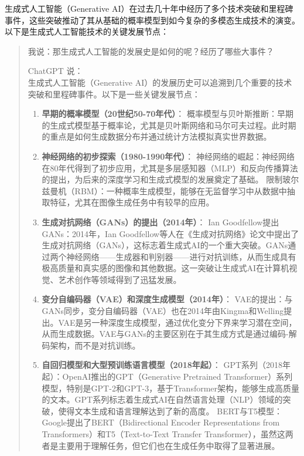 生成式人工智能（Generative AI）在过去几十年中经历了多个技术突破和里程碑事件，这些突破推动了其从基础的概率模型到如今复杂的多模态生成技术的演变。以下是生成式人工智能技术的关键发展节点：

\begin{quote}
我说：那生成式人工智能的发展史是如何的呢？经历了哪些大事件？

ChatGPT 说：\\
生成式人工智能（Generative AI）的发展历史可以追溯到几个重要的技术突破和里程碑事件。以下是一些关键发展节点：

\begin{enumerate}
  \item \textbf{早期的概率模型（20世纪50-70年代）}：
  概率模型与贝叶斯推断：早期的生成式模型基于概率论，尤其是贝叶斯网络和马尔可夫过程。此时期的重点是如何生成数据分布并通过统计方法模拟真实世界数据。
  
  \item \textbf{神经网络的初步探索（1980-1990年代）}：
  神经网络的崛起：神经网络在80年代得到了初步应用，尤其是多层感知器（MLP）和反向传播算法的提出，为后来的深度学习和生成式模型的发展奠定了基础。
  限制玻尔兹曼机（RBM）：一种概率生成模型，能够在无监督学习中从数据中抽取特征，尤其在图像生成任务中有较早的应用。

  \item \textbf{生成对抗网络（GANs）的提出（2014年）}：
  Ian Goodfellow提出GANs：2014年，Ian Goodfellow等人在《生成对抗网络》论文中提出了生成对抗网络（GANs），这标志着生成式AI的一个重大突破。GANs通过两个神经网络——生成器和判别器——进行对抗训练，从而生成具有极高质量和真实感的图像和其他数据。这一突破让生成式AI在计算机视觉、艺术创作等领域得到了迅猛发展。

  \item \textbf{变分自编码器（VAE）和深度生成模型（2014年）}：
  VAE的提出：与GANs同步，变分自编码器（VAE）也在2014年由Kingma和Welling提出。VAE是另一种深度生成模型，通过优化变分下界来学习潜在空间，从而生成数据。VAE与GANs的主要区别在于其生成方式是通过编码-解码架构，而不是对抗训练。

  \item \textbf{自回归模型和大型预训练语言模型（2018年起）}：
  GPT系列（2018年起）：OpenAI推出的GPT（Generative Pretrained Transformer）系列模型，特别是GPT-2和GPT-3，基于Transformer架构，能够生成高质量的文本。GPT系列标志着生成式AI在自然语言处理（NLP）领域的突破，使得文本生成和语言理解达到了新的高度。  
  BERT与T5模型：Google提出了BERT（Bidirectional Encoder Representations from Transformers）和T5（Text-to-Text Transfer Transformer），虽然这两者是主要用于理解任务，但它们也在生成任务中取得了显著进展。


\end{enumerate}
\end{quote}

